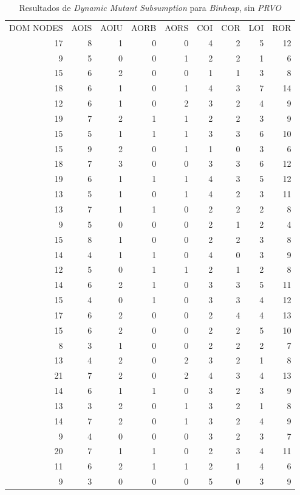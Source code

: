 \begin{table}[]
	\caption[\emph{Dynamic Mutant Subsumption} \emph{Binheap}, sin \emph{PRVO}]{Resultados de \emph{Dynamic Mutant Subsumption} para \emph{Binheap}, sin \emph{PRVO}}
	\label{tables.results.subsumption.binheap.noprvo}
	\centering
	\scriptsize
	\def\arraystretch{0.95}
	\setlength\tabcolsep{0.5mm}
	\begin{tabular}{rrrrrrrrr}
		DOM NODES & AOIS & AOIU & AORB & AORS & COI & COR & LOI & ROR \\
		17 & 8 & 1 & 0 & 0 & 4 & 2 & 5 & 12 \\
		9 & 5 & 0 & 0 & 1 & 2 & 2 & 1 & 6 \\
		15 & 6 & 2 & 0 & 0 & 1 & 1 & 3 & 8 \\
		18 & 6 & 1 & 0 & 1 & 4 & 3 & 7 & 14 \\
		12 & 6 & 1 & 0 & 2 & 3 & 2 & 4 & 9 \\
		19 & 7 & 2 & 1 & 1 & 2 & 2 & 3 & 9 \\
		15 & 5 & 1 & 1 & 1 & 3 & 3 & 6 & 10 \\
		15 & 9 & 2 & 0 & 1 & 1 & 0 & 3 & 6 \\
		18 & 7 & 3 & 0 & 0 & 3 & 3 & 6 & 12 \\
		19 & 6 & 1 & 1 & 1 & 4 & 3 & 5 & 12 \\
		13 & 5 & 1 & 0 & 1 & 4 & 2 & 3 & 11 \\
		13 & 7 & 1 & 1 & 0 & 2 & 2 & 2 & 8 \\
		9 & 5 & 0 & 0 & 0 & 2 & 1 & 2 & 4 \\
		15 & 8 & 1 & 0 & 0 & 2 & 2 & 3 & 8 \\
		14 & 4 & 1 & 1 & 0 & 4 & 0 & 3 & 9 \\
		12 & 5 & 0 & 1 & 1 & 2 & 1 & 2 & 8 \\
		14 & 6 & 2 & 1 & 0 & 3 & 3 & 5 & 11 \\
		15 & 4 & 0 & 1 & 0 & 3 & 3 & 4 & 12 \\
		17 & 6 & 2 & 0 & 0 & 2 & 4 & 4 & 13 \\
		15 & 6 & 2 & 0 & 0 & 2 & 2 & 5 & 10 \\
		8 & 3 & 1 & 0 & 0 & 2 & 2 & 2 & 7 \\
		13 & 4 & 2 & 0 & 2 & 3 & 2 & 1 & 8 \\
		21 & 7 & 2 & 0 & 2 & 4 & 3 & 4 & 13 \\
		14 & 6 & 1 & 1 & 0 & 3 & 2 & 3 & 9 \\
		13 & 3 & 2 & 0 & 1 & 3 & 2 & 1 & 8 \\
		14 & 7 & 2 & 0 & 1 & 3 & 2 & 4 & 9 \\
		9 & 4 & 0 & 0 & 0 & 3 & 2 & 3 & 7 \\
		20 & 7 & 1 & 1 & 0 & 2 & 3 & 4 & 11 \\
		11 & 6 & 2 & 1 & 1 & 2 & 1 & 4 & 6 \\
		9 & 3 & 0 & 0 & 0 & 5 & 0 & 3 & 9
	\end{tabular}
\end{table}

